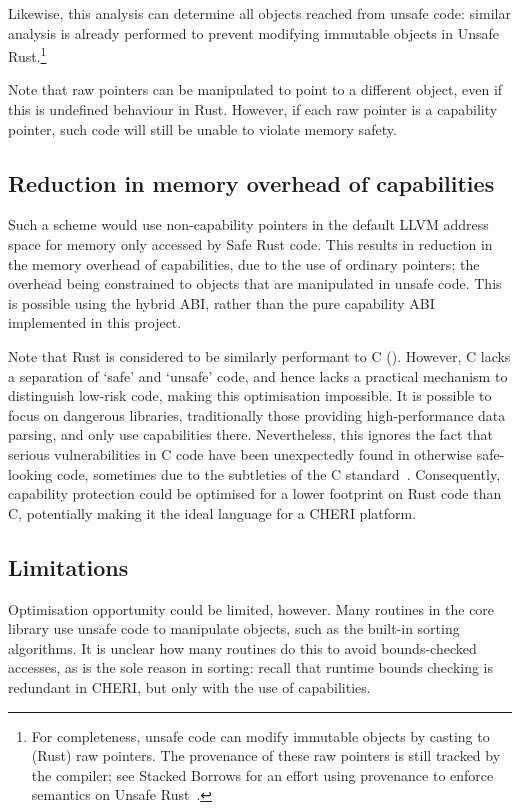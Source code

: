 \documentclass[dissertation.tex]{subfiles}
\begin{document}
Likewise, this analysis can determine all objects reached from unsafe
code: similar analysis is already performed to prevent modifying
immutable objects in Unsafe Rust.\footnote{
For completeness, unsafe code can modify immutable objects by casting to
(Rust) raw pointers.
The provenance of these raw pointers is still tracked by the compiler;
see Stacked Borrows for an effort using provenance to enforce semantics
on Unsafe Rust~\cite{rust-stacked-borrows}.
}

Note that raw pointers can be manipulated to point to a different
object, even if this is undefined behaviour in Rust.
However, if each raw pointer is a capability pointer, such code will
still be unable to violate memory safety.


\subsection{Reduction in memory overhead of capabilities}
Such a scheme would use non-capability pointers in the default LLVM
address space for memory only accessed by Safe Rust code.
This results in reduction in the memory overhead of capabilities, due to
the use of ordinary pointers; the overhead being constrained to objects
that are manipulated in unsafe code.
This is possible using the hybrid ABI, rather than the pure capability
ABI implemented in this project.

Note that Rust is considered to be similarly performant to C
().
However, C lacks a separation of `safe' and `unsafe' code, and hence
lacks a practical mechanism to distinguish low-risk code, making this
optimisation impossible.
It is possible to focus on dangerous libraries, traditionally those
providing high-performance data parsing, and only use capabilities
there.
Nevertheless, this ignores the fact that serious vulnerabilities in C code
have been unexpectedly found in otherwise safe-looking code, sometimes
due to the subtleties of the C standard~\cite{memarian2016cdepths}.
Consequently, capability protection could be optimised for a lower
footprint on Rust code than C, potentially making it the ideal language
for a CHERI platform.


\subsection{Limitations}
Optimisation opportunity could be limited, however.
Many routines in the core library use unsafe code to manipulate objects,
such as the built-in sorting algorithms.
It is unclear how many routines do this to avoid bounds-checked
accesses, as is the sole reason in sorting: recall that runtime bounds
checking is redundant in CHERI, but only with the use of capabilities.
\end{document}
